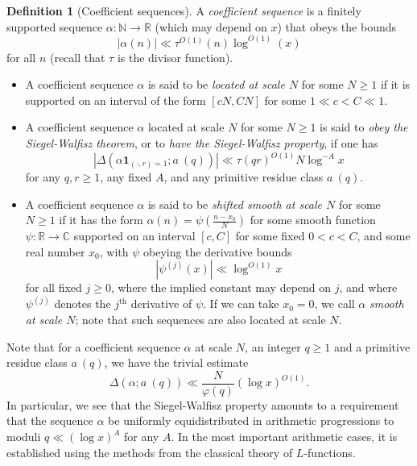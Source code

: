 \documentclass[12pt,a4paper,reqno]{amsart}
\numberwithin{equation}{section}
\theoremstyle{plain}
\theoremstyle{definition}
\newtheorem{definition}[theorem]{Definition}
\newcommand\R{\mathbb{R}}
\newcommand\N{\mathbb{N}}
\newcommand\C{\mathbb{C}}
\newcommand{\onef}{\mathbf{1}}
\begin{document}
\begin{definition}[Coefficient sequences]\label{Coef}  A \emph{coefficient sequence} is a finitely supported sequence $\alpha \colon \N \to \R$ (which may depend on $x$) that obeys the bounds
\begin{equation}\label{alpha-bound}
|\alpha(n)| \ll \tau^{O(1)}(n) \log^{O(1)}(x)
\end{equation}
for all $n$ (recall that $\tau$ is the divisor function).
\begin{itemize}
\item[(i)]  A coefficient sequence $\alpha$ is said to be \emph{located at scale $N$} for some $N \geq 1$ if it is supported on an interval of the form $[cN, CN]$ for some $1 \ll c < C \ll 1$.
\item[(ii)] A coefficient sequence $\alpha$ located at scale $N$ for
  some $N \geq 1$ is said to \emph{obey the Siegel-Walfisz theorem},
  or to \emph{have the Siegel-Walfisz property}, if one has
\begin{equation}\label{sig}
| \Delta(\alpha \onef_{(\cdot,r)=1}; a\ (q)) | \ll \tau(qr)^{O(1)} N \log^{-A} x 
\end{equation}
for any $q,r \geq 1$, any fixed $A$, and any primitive residue class $a\ (q)$.  
\item[(iii)]  A coefficient sequence $\alpha$ is said to be
  \emph{shifted smooth at scale $N$} for some $N \geq 1$ if it has the form $\alpha(n) = \psi(\frac{n-x_0}{N})$ for some smooth function $\psi \colon \R \to \C$ supported on an interval $[c,C]$ for some fixed $0 < c < C$, and some real number $x_0$, with $\psi$ obeying the derivative bounds
\begin{equation}\label{soso}
|\psi^{(j)}(x)| \ll \log^{O(1)} x
\end{equation}
for all fixed $j \geq 0$, where the implied constant may depend on
$j$, and where $\psi^{(j)}$ denotes the $j^{\operatorname{th}}$ derivative of $\psi$.
If we can take $x_0=0$, we call $\alpha$ \emph{smooth at scale $N$};
note that such sequences are also located at scale $N$.
\end{itemize}
\end{definition}

Note that for a coefficient sequence $\alpha$ at scale $N$, an
integer $q\geq 1$ and a primitive residue class $a\ (q)$, we have the
trivial estimate
\begin{equation}\label{eq-delta-trivial}
\Delta(\alpha;a\ (q))\ll \frac{N}{\varphi(q)}(\log x)^{O(1)}.
\end{equation}
In particular, we see that the Siegel-Walfisz property amounts to a
requirement that the sequence $\alpha$ be uniformly equidistributed in
arithmetic progressions to moduli $q\ll (\log x)^A$ for any $A$. In
the most important arithmetic cases, it is established using the
methods from the classical theory of $L$-functions.
\end{document}
